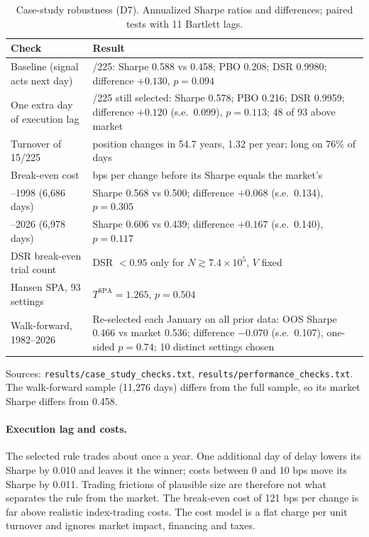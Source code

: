 \documentclass[11pt,a4paper]{article}
\theoremstyle{remark}
\begin{document}
\begin{table}[t]
\centering\small
\begin{threeparttable}
\caption{Case-study robustness (D7). Annualized Sharpe ratios and differences; paired tests with 11 Bartlett lags.}\label{tab:robust}
\begin{tabularx}{\textwidth}{@{}>{\raggedright\arraybackslash}p{4.3cm}>{\raggedright\arraybackslash}X@{}}
\toprule
Check & Result \\
\midrule
Baseline (signal acts next day) & 15/225: Sharpe 0.588 vs 0.458; PBO 0.208; DSR 0.9980; difference $+0.130$, $p=0.094$ \\
One extra day of execution lag & 15/225 still selected: Sharpe 0.578; PBO 0.216; DSR 0.9959; difference $+0.120$ (s.e.\ 0.099), $p=0.113$; 48 of 93 above market \\
Turnover of 15/225 & 72 position changes in 54.7 years, 1.32 per year; long on 76\% of days \\
Break-even cost & 121 bps per change before its Sharpe equals the market's \\
1972--1998 (6,686 days) & Sharpe 0.568 vs 0.500; difference $+0.068$ (s.e.\ 0.134), $p=0.305$ \\
1999--2026 (6,978 days) & Sharpe 0.606 vs 0.439; difference $+0.167$ (s.e.\ 0.140), $p=0.117$ \\
DSR break-even trial count & DSR $<0.95$ only for $N\gtrsim7.4\times10^5$, $V$ fixed \\
Hansen SPA, 93 settings & $T^{\mathrm{SPA}}=1.265$, $p=0.504$ \\
Walk-forward, 1982--2026 & Re-selected each January on all prior data: OOS Sharpe 0.466 vs market 0.536; difference $-0.070$ (s.e.\ 0.107), one-sided $p=0.74$; 10 distinct settings chosen \\
\bottomrule
\end{tabularx}
\begin{tablenotes}\footnotesize
\item Sources: \texttt{results/case\_study\_checks.txt}, \texttt{results/performance\_checks.txt}. The walk-forward sample (11,276 days) differs from the full sample, so its market Sharpe differs from 0.458.
\end{tablenotes}
\end{threeparttable}
\end{table}

\paragraph{Execution lag and costs.} The selected rule trades about once a year. One additional day of delay lowers its Sharpe by 0.010 and leaves it the winner; costs between 0 and 10 bps move its Sharpe by 0.011. Trading frictions of plausible size are therefore not what separates the rule from the market. The break-even cost of 121 bps per change is far above realistic index-trading costs. The cost model is a flat charge per unit turnover and ignores market impact, financing and taxes.
\end{document}
